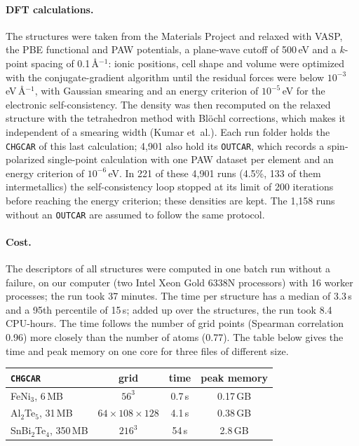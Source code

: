 \documentclass[journal=jctcce,manuscript=suppinfo,email=true]{achemso}
\newcommand{\rev}[1]{{\color{blue}#1}}
\begin{document}
\paragraph{DFT calculations.} The structures were taken from the Materials
Project and relaxed with VASP, the PBE functional and PAW potentials, a
plane-wave cutoff of 500\,eV and a $k$-point spacing of 0.1\,\AA$^{-1}$: ionic
positions, cell shape and volume were optimized with the conjugate-gradient
algorithm until the residual forces were below $10^{-3}$\,eV\,\AA$^{-1}$, with
Gaussian smearing and an energy criterion of $10^{-5}$\,eV for the electronic
self-consistency. The density was then recomputed on the relaxed structure with
the tetrahedron method with Bl\"ochl corrections, which makes it independent of
a smearing width (Kumar et~al.). Each run folder holds the \texttt{CHGCAR} of
this last calculation; 4,901 also hold its \texttt{OUTCAR}, which records a
spin-polarized single-point calculation with one PAW dataset per element and an
energy criterion of $10^{-6}$\,eV. In 221 of these 4,901 runs (4.5\%, 133 of them
intermetallics) the self-consistency loop stopped at its limit of 200
iterations before reaching the energy criterion; these densities are kept. The
1,158 runs without an \texttt{OUTCAR} are assumed to follow the same protocol.

\paragraph{Cost.} The descriptors of all structures were computed in one
batch run without a failure, on our computer (two Intel Xeon Gold 6338N processors) with 16
worker processes; the run took 37 minutes. The time per structure has a median of
3.3\,s and a 95th percentile of 15\,s; added up over the structures, the run
took 8.4 CPU-hours. The time follows the number of grid points (Spearman
correlation 0.96) more closely than the number of atoms (0.77). The table
below gives the time and peak memory on one core for three files of different size.

\begin{center}
\small
\begin{tabular}{lccc}
\toprule
\texttt{CHGCAR} & grid & time & peak memory \\
\midrule
FeNi$_3$, 6\,MB & $56^3$ & 0.7\,s & \rev{0.17}\,GB \\
Al$_2$Te$_5$, 31\,MB & $64\times108\times128$ & 4.1\,s & \rev{0.38}\,GB \\
SnBi$_2$Te$_4$, 350\,MB & $216^3$ & 54\,s & \rev{2.8}\,GB \\
\bottomrule
\end{tabular}
\end{center}
\end{document}
